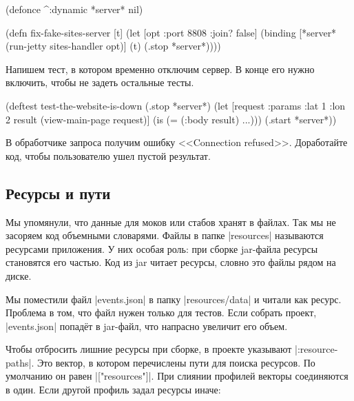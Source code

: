 
\begin{english}
  \begin{clojure}
(defonce ^:dynamic *server* nil)

(defn fix-fake-sites-server [t]
  (let [opt {:port 8808 :join? false}]
    (binding [*server* (run-jetty sites-handler opt)]
      (t)
      (.stop *server*))))
  \end{clojure}
\end{english}

Напишем тест, в котором временно отключим сервер. В конце его нужно включить,
чтобы не задеть остальные тесты.

\begin{english}
  \begin{clojure}
(deftest test-the-website-is-down
  (.stop *server*)
  (let [request {:params {:lat 1 :lon 2}}
        result (view-main-page request)]
    (is (= (:body result) {...})))
  (.start *server*))
  \end{clojure}
\end{english}

В обработчике запроса получим ошибку <<Connection refused>>. Доработайте код,
чтобы пользователю ушел пустой результат.

\subsection{Ресурсы и пути}

\label{resources}


Мы упомянули, что данные для моков или стабов хранят в файлах. Так мы не
засоряем код объемными словарями. Файлы в папке \spverb|resources| называются
ресурсами приложения. У них особая роль: при сборке jar-файла ресурсы становятся
его частью. Код из jar читает ресурсы, словно это файлы рядом на диске.

Мы поместили файл \spverb|events.json| в папку \spverb|resources/data| и читали
как ресурс. Проблема в том, что файл нужен только для тестов. Если собрать
проект, \spverb|events.json| попад\"{е}т в jar-файл, что напрасно увеличит его
объем.

Чтобы отбросить лишние ресурсы при сборке, в проекте указывают
\spverb|:resource-paths|. Это вектор, в котором перечислены пути для поиска
ресурсов. По умолчанию он равен \spverb|["resources"]|. При слиянии профилей
векторы соединяются в один. Если другой профиль задал ресурсы иначе:

